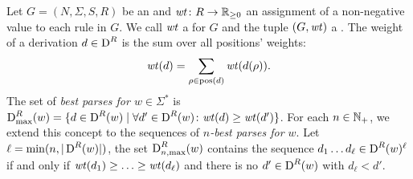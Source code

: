 \documentclass[../../document.tex]{subfiles}
\begin{document}
    \begin{definition}
        Let \(G = (N, \varSigma, S, R)\) be an  and \(\mathit{wt} \colon R \to \mathbb{R}_{\ge 0}\) an assignment of a non-negative value to each rule in \(G\).
        We call \(\mathit{wt}\) a  for \(G\) and the tuple \((G, \mathit{wt})\) a .
        The weight of a derivation \(d \in \operatorname{D}^R\) is the sum over all positions' weights: \[ \mathit{wt}(d) = \sum_{\rho \in \operatorname{pos}(d)} \mathit{wt}(d(\rho))\text{.} \]
        The set of \emph{best parses for \(w \in \varSigma^*\)} is \(\operatorname{D}^R_{\mathrm{max}}(w) = \{ d \in \operatorname{D}^R(w) \mid \forall d' \in \operatorname{D}^R(w)\colon \mathit{wt}(d) \geq \mathit{wt}(d') \}\).
        For each \(n\in \mathbb{N}_+\), we extend this concept to the sequences of \emph{\(n\)-best parses for \(w\)}.
        Let \(\ell = \min(n, |\operatorname{D}^R(w)|)\), the set \(\operatorname{D}^R_{n,\max}(w)\) contains the sequence \(d_1 \ldots d_\ell \in \operatorname{D}^R(w)^\ell\) if and only if \(\mathit{wt}(d_1) \geq \ldots \geq \mathit{wt}(d_\ell)\) and there is no \(d' \in \operatorname{D}^R(w)\) with \(d_\ell < d'\).
    \end{definition}
\end{document}

